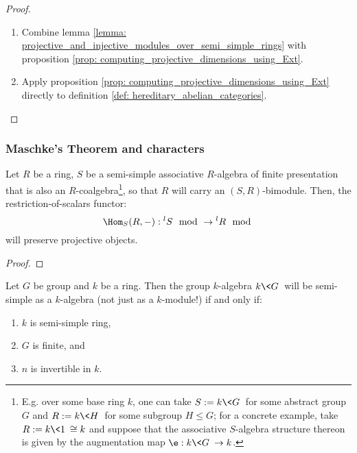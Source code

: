                 \begin{proof}
                    \noindent
                    \begin{enumerate}
                        \item Combine lemma \ref{lemma: projective_and_injective_modules_over_semi_simple_rings} with proposition \ref{prop: computing_projective_dimensions_using_Ext}.
                        \item Apply proposition \ref{prop: computing_projective_dimensions_using_Ext} directly to definition \ref{def: hereditary_abelian_categories}.
                    \end{enumerate}
                \end{proof}
        
        \subsubsection{Maschke's Theorem and characters}
            \begin{lemma} \label{lemma: projectivity_and_restriction_of_scalars}
                Let $R$ be a ring, $S$ be a semi-simple associative $R$-algebra of finite presentation that is also an $R$-coalgebra\footnote{E.g. over some base ring $k$, one can take $S := k\<G\>$ for some abstract group $G$ and $R := k\<H\>$ for some subgroup $H \leq G$; for a concrete example, take $R := k\<1\> \cong k$ and suppose that the associative $S$-algebra structure thereon is given by the augmentation map $\e: k\<G\> \to k$.}, so that $R$ will carry an $(S, R)$-bimodule. Then, the restriction-of-scalars functor:
                    $$\Hom_S(R, -): {}^lS\mod \to {}^lR\mod$$
                will preserve projective objects.
            \end{lemma}
                \begin{proof}
                    
                \end{proof}
            \begin{theorem} \label{theorem: maschke_theorem}
                Let $G$ be group and $k$ be a ring. Then the group $k$-algebra $k\<G\>$ will be semi-simple as a $k$-algebra (not just as a $k$-module!) if and only if:
                    \begin{enumerate}
                        \item $k$ is semi-simple ring,
                        \item $G$ is finite, and
                        \item $n$ is invertible in $k$.
                    \end{enumerate}
            \end{theorem}
